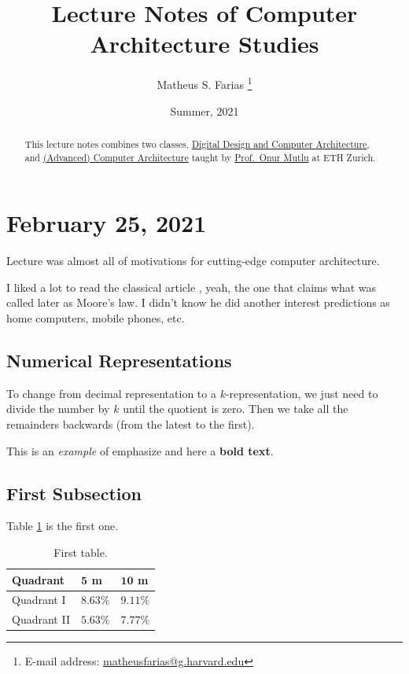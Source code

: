 \documentclass[abstract=true]{scrartcl}
\begin{document}
\title{Lecture Notes of Computer Architecture Studies}
\date{Summer, 2021}

\author{Matheus S. Farias%
  \thanks{E-mail address: \href{mailto:matheusfarias@g.harvard.edu}{matheusfarias@g.harvard.edu}}}

\maketitle

\begin{abstract}
    This lecture notes combines two classes, \href{https://safari.ethz.ch/digitaltechnik/spring2021/doku.php?id=schedule}{Digital Design and Computer Architecture}, and \href{https://safari.ethz.ch/architecture/fall2020/doku.php?id=schedule}{(Advanced) Computer Architecture} taught by \href{https://people.inf.ethz.ch/omutlu/}{Prof.\ Onur Mutlu} at ETH Zurich.
\end{abstract}

\tableofcontents

\section{February 25, 2021}
Lecture was almost all of motivations for cutting-edge computer architecture.

I liked a lot to read the classical article \cite{moore65}, yeah, the one that
claims what was called later as Moore's law. I didn't know he did another interest
predictions as home computers, mobile phones, etc.

\subsection{Numerical Representations}

To change from decimal representation to a $k$-representation, we just need 
to divide the number by $k$ until the quotient is zero. Then we take all 
the remainders backwards (from the latest to the first).


This is an \emph{example} of emphasize and here a \textbf{bold text}.

\subsection{First Subsection}

Table \ref{tab:ref} is the first one.
\begin{table}
    \centering
    \caption{\label{tab:ref}First table.}
    \vspace{5pt}
    \begin{tabular}{@{}lll@{}}
    \toprule
    \textbf{Quadrant}    & $\mathbf{5}$ \textbf{m}    & $\mathbf{10}$ \textbf{m}    \\
    \midrule
    Quadrant I  & $8.63\%$ & $9.11\%$ \\
    Quadrant II & $5.63\%$ & $7.77\%$   \\ 
    \bottomrule
\end{tabular}
\end{table}
\end{document}
